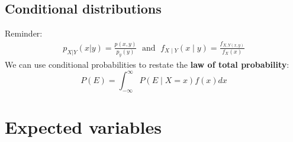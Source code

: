 \documentclass{article}
\begin{document}
\subsection{Conditional distributions}
\textrm{Reminder: }
\begin{align*}
    p_{X|Y}(x|y) = \frac{p(x,y)}{p_y(y)} \; \textrm{ and } \; f_{X\mid Y}(x \mid y) = \frac{f_{X,Y(x, y)}}{f_X(x)}
\end{align*}
We can use conditional probabilities to restate the \textbf{law of total probability}:
\begin{equation*}
    P(E) = \int_{-\infty}^\infty P(E \mid X=x)f(x)dx
\end{equation*}




\section{Expected variables}
\end{document}
